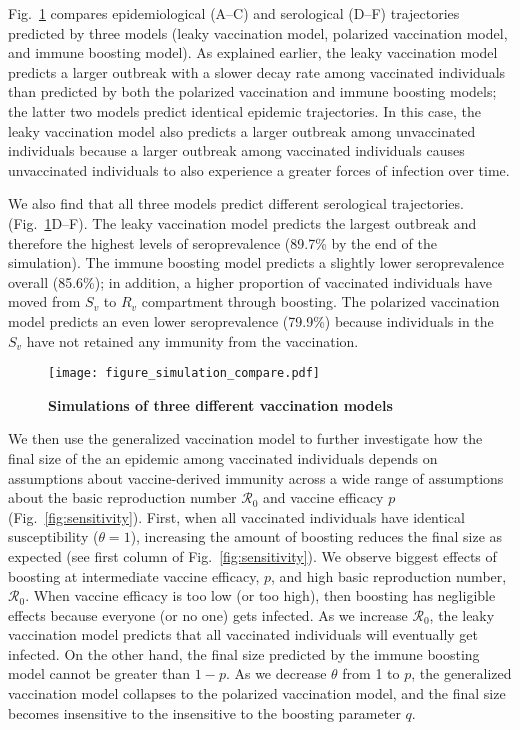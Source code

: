 \documentclass[12pt]{article}
\newcommand{\fref}[1]{Fig.~\ref{fig:#1}}
\begin{document}
\fref{simulation} compares epidemiological (A--C) and serological (D--F) trajectories predicted by three models (leaky vaccination model, polarized vaccination model, and immune boosting model).
As explained earlier, the leaky vaccination model predicts a larger outbreak with a slower decay rate among vaccinated individuals than predicted by both the polarized vaccination and immune boosting models;
the latter two models predict identical epidemic trajectories.
In this case, the leaky vaccination model also predicts a larger outbreak among unvaccinated individuals because a larger outbreak among vaccinated individuals causes unvaccinated individuals to also experience a greater forces of infection over time.

We also find that all three models predict different serological trajectories. (\fref{simulation}D--F).
The leaky vaccination model predicts the largest outbreak and therefore the highest levels of seroprevalence (89.7\% by the end of the simulation).
The immune boosting model predicts a slightly lower seroprevalence overall (85.6\%);
in addition, a higher proportion of vaccinated individuals have moved from $S_v$ to $R_v$ compartment through boosting.
The polarized vaccination model predicts an even lower seroprevalence (79.9\%) because individuals in the $S_v$ have not retained any immunity from the vaccination.

\begin{figure}[!th]
\texttt{[image: figure\_simulation\_compare.pdf]}
\caption{
\textbf{Simulations of three different vaccination models}
\label{fig:simulation}
}
\end{figure}

We then use the generalized vaccination model to further investigate how the final size of the an epidemic among vaccinated individuals depends on assumptions about vaccine-derived immunity across a wide range of assumptions about the basic reproduction number $\mathcal R_0$ and vaccine efficacy $p$ (\fref{sensitivity}).
First, when all vaccinated individuals have identical susceptibility ($\theta = 1$), increasing the amount of boosting reduces the final size as expected (see first column of \fref{sensitivity}).
We observe biggest effects of boosting at intermediate vaccine efficacy, $p$, and high basic reproduction number, $\mathcal R_0$.
When vaccine efficacy is too low (or too high), then boosting has negligible effects because everyone (or no one) gets infected.
As we increase $\mathcal R_0$, the leaky vaccination model predicts that all vaccinated individuals will eventually get infected.
On the other hand, the final size predicted by the immune boosting model cannot be greater than $1-p$.
As we decrease $\theta$ from 1 to $p$, the generalized vaccination model collapses to the polarized vaccination model, and the final size becomes insensitive to the insensitive to the boosting parameter $q$.
\end{document}
